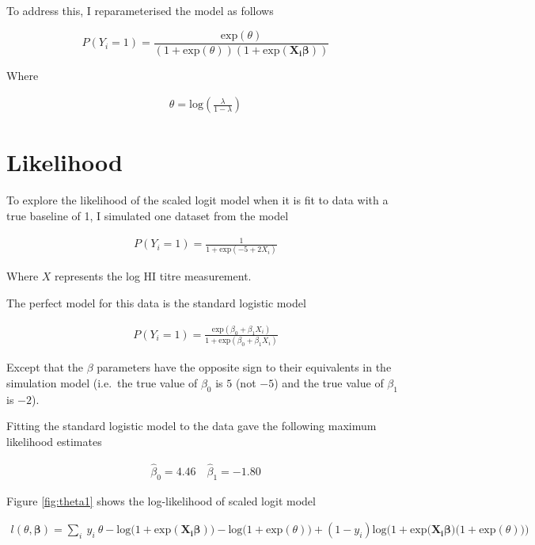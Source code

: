 \documentclass[]{article}
\begin{document}
To address this, I reparameterised the model as follows

\begin{equation}
  P(Y_i=1)=\frac{\text{exp}(\theta)}{(1 + \text{exp}(\theta))(1 +
\text{exp}(\boldsymbol{X_i}\boldsymbol{\beta}))} 
\end{equation}

Where

\begin{align*}
\theta = \text{log}(\frac{\lambda}{1 - \lambda})
\end{align*}

\pagebreak

\hypertarget{likelihood}{%
\section{Likelihood}\label{likelihood}}

To explore the likelihood of the scaled logit model when it is fit to data with a true baseline of 1, I simulated one dataset from the model

\begin{align*}
  P(Y_i=1)=\frac{1}{1 + \text{exp}(-5 + 2X_i)} 
\end{align*}

Where \(X\) represents the log HI titre measurement.

The perfect model for this data is the standard logistic model

\begin{align*}
  P(Y_i=1)=\frac{\text{exp}(\beta_0 + \beta_1 X_i)}{1 + \text{exp}(\beta_0 + \beta_1 X_i)} 
\end{align*}

Except that the \(\beta\) parameters have the opposite sign to their equivalents in the simulation model (i.e.~the true value of \(\beta_0\) is \(5\) (not \(-5\)) and the true value of \(\beta_1\) is \(-2\)).

Fitting the standard logistic model to the data gave the following maximum likelihood estimates

\begin{align*}
  \hat{\beta}_0 = 4.46 \quad \hat{\beta}_1 = -1.80
\end{align*}

Figure \ref{fig:theta1} shows the log-likelihood of scaled logit model

\begin{align}
l(\theta, \boldsymbol{\beta}) = 
\sum_i \ y_i \ \theta -
\text{log} \big( 1+\text{exp}(\boldsymbol{X_i}\boldsymbol{\beta}) \big) -
\text{log} \big( 1+\text{exp}(\theta) \big) +
(1-y_i)\text{log} 
\Big( 1 + \text{exp} \big( \boldsymbol{X_i}\boldsymbol{\beta} \big) \big( 1 + 
\text{exp}(\theta) \big) \Big)
\end{align}
\end{document}
